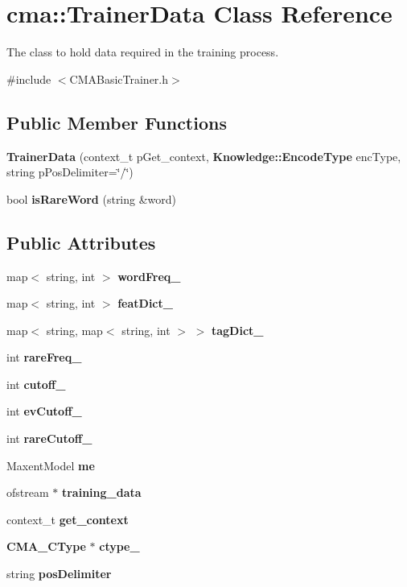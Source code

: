\section{cma::TrainerData Class Reference}
\label{classcma_1_1TrainerData}


The class to hold data required in the training process.  


{\ttfamily \#include $<$CMABasicTrainer.h$>$}\subsection*{Public Member Functions}
\begin{DoxyCompactItemize}
\item 
{\bfseries TrainerData} (context\_\-t pGet\_\-context, {\bf Knowledge::EncodeType} encType, string pPosDelimiter=\char`\"{}/\char`\"{})\label{classcma_1_1TrainerData_a52479f4d8dfb9764cc59b226c06658da}

\item 
bool {\bfseries isRareWord} (string \&word)\label{classcma_1_1TrainerData_a309417a7099ac688be954c81a9c98742}

\end{DoxyCompactItemize}
\subsection*{Public Attributes}
\begin{DoxyCompactItemize}
\item 
map$<$ string, int $>$ {\bf wordFreq\_\-}
\item 
map$<$ string, int $>$ {\bf featDict\_\-}
\item 
map$<$ string, map$<$ string, int $>$ $>$ {\bf tagDict\_\-}
\item 
int {\bf rareFreq\_\-}
\item 
int {\bf cutoff\_\-}
\item 
int {\bf evCutoff\_\-}
\item 
int {\bfseries rareCutoff\_\-}\label{classcma_1_1TrainerData_a29cc800fcc110731293ef351c7a7bfdf}

\item 
MaxentModel {\bf me}
\item 
ofstream $\ast$ {\bf training\_\-data}
\item 
context\_\-t {\bf get\_\-context}
\item 
{\bf CMA\_\-CType} $\ast$ {\bf ctype\_\-}
\item 
string {\bf posDelimiter}
\end{DoxyCompactItemize}


